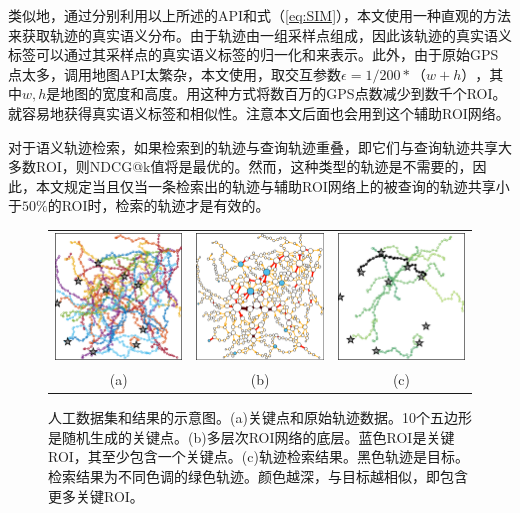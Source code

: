 类似地，通过分别利用以上所述的API和式（\ref{eq:SIM}），本文使用一种直观的方法来获取轨迹的真实语义分布。由于轨迹由一组采样点组成，因此该轨迹的真实语义标签可以通过其采样点的真实语义标签的归一化和来表示。此外，由于原始GPS点太多，调用地图API太繁杂，本文使用，取交互参数$\epsilon = 1/200 *（w + h）$，其中$w,h$是地图的宽度和高度。用这种方式将数百万的GPS点数减少到数千个ROI。就容易地获得真实语义标签和相似性。注意本文后面也会用到这个辅助ROI网络。

对于语义轨迹检索，如果检索到的轨迹与查询轨迹重叠，即它们与查询轨迹共享大多数ROI，则NDCG@k值将是最优的。然而，这种类型的轨迹是不需要的，因此，本文规定当且仅当一条检索出的轨迹与辅助ROI网络上的被查询的轨迹共享小于$50\%$的ROI时，检索的轨迹才是有效的。


\tabcolsep=1pt
\begin{figure}[!t]
\centering
\begin{tabular}{ccc}
\includegraphics[width=48mm]{pics/syn1.eps}&
\includegraphics[width=48mm]{pics/syn2.eps}&
\includegraphics[width=48mm]{pics/syn3.eps}\\
(a) & (b) & (c) \\
\end{tabular}
\caption{
人工数据集和结果的示意图。(a)关键点和原始轨迹数据。10个五边形是随机生成的关键点。(b)多层次ROI网络的底层。蓝色ROI是关键ROI，其至少包含一个关键点。(c)轨迹检索结果。黑色轨迹是目标。检索结果为不同色调的绿色轨迹。颜色越深，与目标越相似，即包含更多关键ROI。}
\label{fig:syn}
\end{figure}


